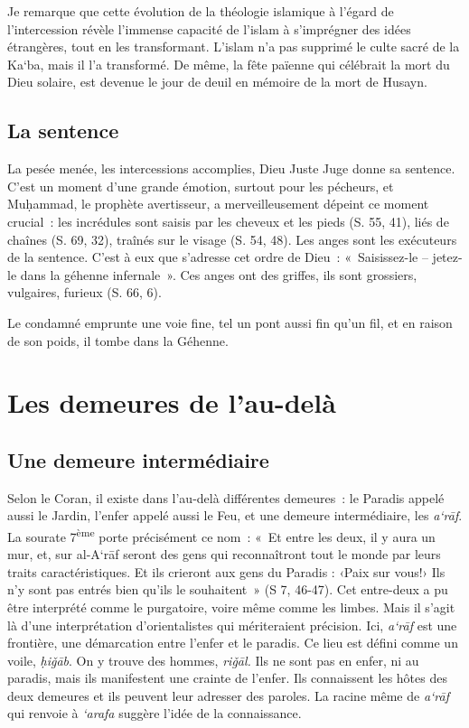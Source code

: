 Je remarque que cette évolution de la théologie islamique à l'égard de
l'intercession révèle l'immense capacité de l'islam à s'imprégner des
idées étrangères, tout en les transformant. L'islam n'a pas supprimé le
culte sacré de la Ka`ba, mais il l'a transformé. De même, la fête
païenne qui célébrait la mort du Dieu solaire, est devenue le jour de
deuil en mémoire de la mort de Husayn.


\subsection{{La sentence
}}

La pesée menée, les intercessions accomplies, Dieu Juste Juge donne sa
sentence. C'est un moment d'une grande émotion, surtout pour les
pécheurs, et Muḥammad, le prophète avertisseur, a merveilleusement
dépeint ce moment crucial~: les incrédules sont saisis par les cheveux
et les pieds (S. 55, 41), liés de chaînes (S. 69, 32), traînés sur le
visage (S. 54, 48). Les anges sont les exécuteurs de la sentence. C'est
à eux que s'adresse cet ordre de Dieu~: «~Saisissez-le -- jetez-le dans
la géhenne infernale~». Ces anges ont des griffes, ils sont grossiers,
vulgaires, furieux (S. 66, 6).

Le condamné emprunte une voie fine, tel un pont aussi fin qu'un fil, et
en raison de son poids, il tombe dans la Géhenne.



 
\section{Les demeures de
l'au-delà~} 

\subsection{Une demeure
intermédiaire} 

Selon le Coran, il existe dans l'au-delà différentes demeures~: le
Paradis appelé aussi le Jardin, l'enfer appelé aussi le Feu, et une
demeure intermédiaire, les \emph{a`rāf}. La sourate
7\textsuperscript{ème} porte précisément ce nom~: «~Et entre les deux,
il y aura un mur, et, sur al-A`rāf seront des gens qui reconnaîtront
tout le monde par leurs traits caractéristiques. Et ils crieront aux
gens du Paradis : ‹Paix sur vous!› Ils n'y sont pas entrés bien qu'ils
le souhaitent~» (S 7, 46-47). Cet entre-deux a pu être interprété comme
le purgatoire, voire même comme les limbes. Mais il s'agit là d'une
interprétation d'orientalistes qui mériteraient précision. Ici,
\emph{a`rāf} est une frontière, une démarcation entre l'enfer et le
paradis. Ce lieu est défini comme un voile, \emph{ḥiǧāb}. On y trouve
des hommes, \emph{riǧāl.} Ils ne sont pas en enfer, ni au paradis, mais
ils manifestent une crainte de l'enfer. Ils connaissent les hôtes des
deux demeures et ils peuvent leur adresser des paroles. La racine même
de \emph{a`rāf} qui renvoie à \emph{`arafa} suggère l'idée de la
connaissance.

